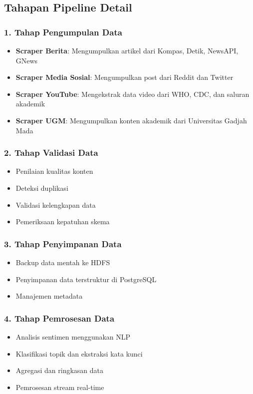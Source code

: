 \documentclass[12pt,a4paper]{article}
\begin{document}
\subsection{Tahapan Pipeline Detail}

\subsubsection{1. Tahap Pengumpulan Data}
\begin{itemize}
    \item \textbf{Scraper Berita}: Mengumpulkan artikel dari Kompas, Detik, NewsAPI, GNews
    \item \textbf{Scraper Media Sosial}: Mengumpulkan post dari Reddit dan Twitter
    \item \textbf{Scraper YouTube}: Mengekstrak data video dari WHO, CDC, dan saluran akademik
    \item \textbf{Scraper UGM}: Mengumpulkan konten akademik dari Universitas Gadjah Mada
\end{itemize}

\subsubsection{2. Tahap Validasi Data}
\begin{itemize}
    \item Penilaian kualitas konten
    \item Deteksi duplikasi
    \item Validasi kelengkapan data
    \item Pemeriksaan kepatuhan skema
\end{itemize}

\subsubsection{3. Tahap Penyimpanan Data}
\begin{itemize}
    \item Backup data mentah ke HDFS
    \item Penyimpanan data terstruktur di PostgreSQL
    \item Manajemen metadata
\end{itemize}

\subsubsection{4. Tahap Pemrosesan Data}
\begin{itemize}
    \item Analisis sentimen menggunakan NLP
    \item Klasifikasi topik dan ekstraksi kata kunci
    \item Agregasi dan ringkasan data
    \item Pemrosesan stream real-time
\end{itemize}
\end{document}
